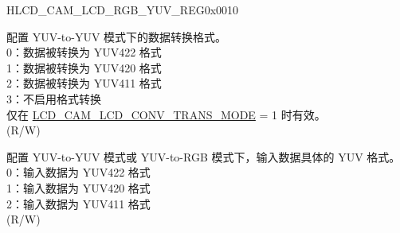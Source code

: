 \begin{register}{H}{LCD\_CAM\_LCD\_RGB\_YUV\_REG}{0x0010}
\begin{regdesc}
\begin{reglist}
\label{fielddesc:LCDCAMLCDCONVYUV2YUVMODE}\item [LCD\_CAM\_LCD\_CONV\_YUV2YUV\_MODE] 配置 YUV-to-YUV 模式下的数据转换格式。\\
0：数据被转换为 YUV422 格式\\
1：数据被转换为 YUV420 格式\\
2：数据被转换为 YUV411 格式\\
3：不启用格式转换\\
仅在
\hyperref[fielddesc:LCDCAMLCDCONVTRANSMODE]{LCD\_CAM\_LCD\_CONV\_TRANS\_MODE} = 1 时有效。\\
(R/W)
\label{fielddesc:LCDCAMLCDCONVYUVMODE}\item [LCD\_CAM\_LCD\_CONV\_YUV\_MODE] 配置 YUV-to-YUV 模式或 YUV-to-RGB 模式下，输入数据具体的 YUV 格式。\\
0：输入数据为 YUV422 格式\\
1：输入数据为 YUV420 格式\\
2：输入数据为 YUV411 格式\\
(R/W)
  \item [见下页...]
  \end{reglist}\end{regdesc}
  \end{register}

